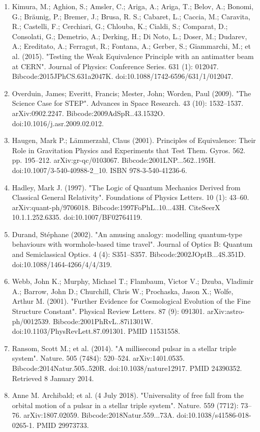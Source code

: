 \begin{enumerate}
\item Kimura, M.; Aghion, S.; Amsler, C.; Ariga, A.; Ariga, T.; Belov, A.; Bonomi, G.; Bräunig, P.; Bremer, J.; Brusa, R. S.; Cabaret, L.; Caccia, M.; Caravita, R.; Castelli, F.; Cerchiari, G.; Chlouba, K.; Cialdi, S.; Comparat, D.; Consolati, G.; Demetrio, A.; Derking, H.; Di Noto, L.; Doser, M.; Dudarev, A.; Ereditato, A.; Ferragut, R.; Fontana, A.; Gerber, S.; Giammarchi, M.; et al. (2015). "Testing the Weak Equivalence Principle with an antimatter beam at CERN". Journal of Physics: Conference Series. 631 (1): 012047. Bibcode:2015JPhCS.631a2047K. doi:10.1088/1742-6596/631/1/012047.
\item Overduin, James; Everitt, Francis; Mester, John; Worden, Paul (2009). "The Science Case for STEP". Advances in Space Research. 43 (10): 1532–1537. arXiv:0902.2247. Bibcode:2009AdSpR..43.1532O. doi:10.1016/j.asr.2009.02.012.
\item Haugen, Mark P.; Lämmerzahl, Claus (2001). Principles of Equivalence: Their Role in Gravitation Physics and Experiments that Test Them. Gyros. 562. pp. 195–212. arXiv:gr-qc/0103067. Bibcode:2001LNP...562..195H. doi:10.1007/3-540-40988-2_10. ISBN 978-3-540-41236-6.
\item Hadley, Mark J. (1997). "The Logic of Quantum Mechanics Derived from Classical General Relativity". Foundations of Physics Letters. 10 (1): 43–60. arXiv:quant-ph/9706018. Bibcode:1997FoPhL..10...43H. CiteSeerX 10.1.1.252.6335. doi:10.1007/BF02764119.
\item Durand, Stéphane (2002). "An amusing analogy: modelling quantum-type behaviours with wormhole-based time travel". Journal of Optics B: Quantum and Semiclassical Optics. 4 (4): S351–S357. Bibcode:2002JOptB...4S.351D. doi:10.1088/1464-4266/4/4/319.
\item Webb, John K.; Murphy, Michael T.; Flambaum, Victor V.; Dzuba, Vladimir A.; Barrow, John D.; Churchill, Chris W.; Prochaska, Jason X.; Wolfe, Arthur M. (2001). "Further Evidence for Cosmological Evolution of the Fine Structure Constant". Physical Review Letters. 87 (9): 091301. arXiv:astro-ph/0012539. Bibcode:2001PhRvL..87i1301W. doi:10.1103/PhysRevLett.87.091301. PMID 11531558.
\item Ransom, Scott M.; et al. (2014). "A millisecond pulsar in a stellar triple system". Nature. 505 (7484): 520–524. arXiv:1401.0535. Bibcode:2014Natur.505..520R. doi:10.1038/nature12917. PMID 24390352. Retrieved 8 January 2014.
\item Anne M. Archibald; et al. (4 July 2018). "Universality of free fall from the orbital motion of a pulsar in a stellar triple system". Nature. 559 (7712): 73–76. arXiv:1807.02059. Bibcode:2018Natur.559...73A. doi:10.1038/s41586-018-0265-1. PMID 29973733.

\end{enumerate}
